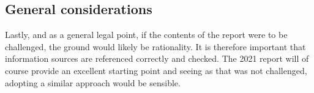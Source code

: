 \documentclass[
]{book}
\begin{document}
\hypertarget{general-considerations}{%
\subsection{General considerations}\label{general-considerations}}

Lastly, and as a general legal point, if the contents of the report were to be challenged, the ground would likely be rationality. It is therefore important that information sources are referenced correctly and checked. The 2021 report will of course provide an excellent starting point and seeing as that was not challenged, adopting a similar approach would be sensible.

  
\end{document}
